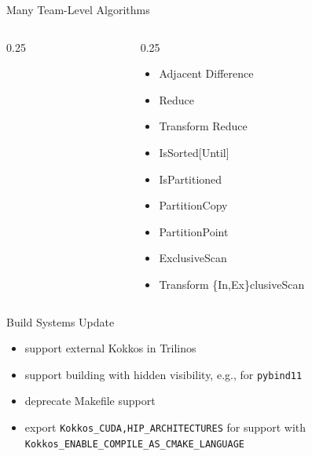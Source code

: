 \begin{frame}[fragile]{Many Team-Level Algorithms}
\begin{columns}
\begin{column}{0.25\textwidth}
\begin{itemize}
\end{itemize}
\end{column} 
\begin{column}{0.25\textwidth}
\begin{itemize}
\item Adjacent Difference
\item Reduce
\item Transform Reduce
\item IsSorted[Until]
\item IsPartitioned
\item PartitionCopy
\item PartitionPoint
\item ExclusiveScan
\item Transform \{In,Ex\}clusiveScan
\end{itemize}
\end{column}
\end{columns}
\end{frame}

\begin{frame}[fragile]{Build Systems Update}
  \begin{itemize}
    \item support external Kokkos in Trilinos
    \item support building with hidden visibility, e.g., for \texttt{pybind11}
    \item deprecate Makefile support
    \item export \texttt{Kokkos\_{CUDA,HIP}\_ARCHITECTURES} for support with \texttt{Kokkos\_ENABLE\_COMPILE\_AS\_CMAKE\_LANGUAGE}
  \end{itemize}
\end{frame}

